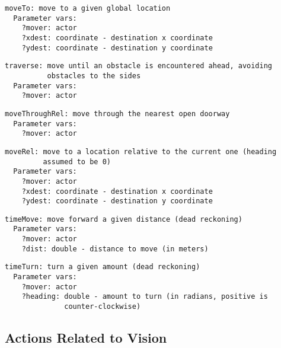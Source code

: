 \documentclass[11pt,letterpaper]{article}
\begin{document}
\begin{Verbatim}
moveTo: move to a given global location
  Parameter vars:
    ?mover: actor
    ?xdest: coordinate - destination x coordinate
    ?ydest: coordinate - destination y coordinate
\end{Verbatim}

\begin{Verbatim}
traverse: move until an obstacle is encountered ahead, avoiding 
          obstacles to the sides
  Parameter vars:
    ?mover: actor
\end{Verbatim}

\begin{Verbatim}
moveThroughRel: move through the nearest open doorway
  Parameter vars:
    ?mover: actor
\end{Verbatim}

\begin{Verbatim}
moveRel: move to a location relative to the current one (heading
         assumed to be 0)
  Parameter vars:
    ?mover: actor
    ?xdest: coordinate - destination x coordinate
    ?ydest: coordinate - destination y coordinate
\end{Verbatim}

\begin{Verbatim}
timeMove: move forward a given distance (dead reckoning)
  Parameter vars:
    ?mover: actor
    ?dist: double - distance to move (in meters)
\end{Verbatim}

\begin{Verbatim}
timeTurn: turn a given amount (dead reckoning)
  Parameter vars:
    ?mover: actor
    ?heading: double - amount to turn (in radians, positive is 
              counter-clockwise)
\end{Verbatim}

\subsection{Actions Related to Vision}
\end{document}
